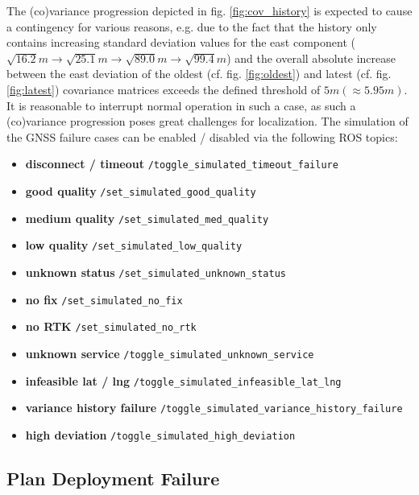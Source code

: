 \documentclass[english, master, utf8]{base/thesis_KBS}
\newcommand{\code}[1]{\colorbox{light-gray}{\texttt{#1}}}
\begin{document}
\noindent
The (co)variance progression depicted in fig. \ref{fig:cov_history} is expected to cause a contingency for various reasons, e.g. due to the fact that the history only
contains increasing standard deviation values for the east component ($\sqrt{16.2} m \rightarrow \sqrt{25.1} m \rightarrow \sqrt{89.0} m \rightarrow \sqrt{99.4} m$) and the overall
absolute increase between the east deviation of the oldest (cf. fig. \ref{fig:oldest}) and latest (cf. fig. \ref{fig:latest}) covariance matrices exceeds the defined threshold
of $5 m (\approx 5.95 m)$. It is reasonable to interrupt normal operation in such a case, as such a (co)variance progression poses great challenges for localization.
The simulation of the GNSS failure cases can be enabled / disabled via the following ROS topics:
\begin{itemize}
    \item \textbf{disconnect / timeout} \textrightarrow \code{/toggle\_simulated\_timeout\_failure}
    \item \textbf{good quality} \textrightarrow \code{/set\_simulated\_good\_quality}
    \item \textbf{medium quality} \textrightarrow \code{/set\_simulated\_med\_quality}
    \item \textbf{low quality} \textrightarrow \code{/set\_simulated\_low\_quality}
    \item \textbf{unknown status} \textrightarrow \code{/set\_simulated\_unknown\_status}
    \item \textbf{no fix} \textrightarrow \code{/set\_simulated\_no\_fix}
    \item \textbf{no RTK} \textrightarrow \code{/set\_simulated\_no\_rtk}
    \item \textbf{unknown service} \textrightarrow \code{/toggle\_simulated\_unknown\_service}
    \item \textbf{infeasible lat / lng} \textrightarrow \code{/toggle\_simulated\_infeasible\_lat\_lng}
    \item \textbf{variance history failure} \textrightarrow \code{/toggle\_simulated\_variance\_history\_failure}
    \item \textbf{high deviation} \textrightarrow \code{/toggle\_simulated\_high\_deviation}
\end{itemize}

\subsection{Plan Deployment Failure}
\label{sec:sim_and_mon_plan_deployment_failures}
\end{document}
